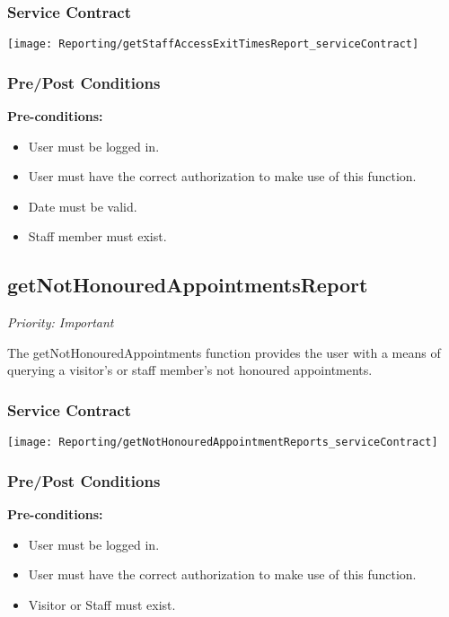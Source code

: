 \subsubsection{Service Contract}
\texttt{[image: Reporting/getStaffAccessExitTimesReport\_serviceContract]}
\subsubsection{Pre/Post Conditions}		
	\textbf{Pre-conditions:}
	\begin{itemize}
		\item User must be logged in.
		\item User must have the correct authorization to make use of this function.
		\item Date must be valid.
		\item Staff member must exist.
	\end{itemize}

\subsection{getNotHonouredAppointmentsReport}
\textit{Priority: Important}

	The getNotHonouredAppointments function provides the user with a means of querying a visitor's or staff member's not honoured appointments.

		
\subsubsection{Service Contract}
\texttt{[image: Reporting/getNotHonouredAppointmentReports\_serviceContract]}
\subsubsection{Pre/Post Conditions}
	\textbf{Pre-conditions:}
	\begin{itemize}
		\item User must be logged in.
		\item User must have the correct authorization to make use of this function.
		\item Visitor or Staff must exist.
	\end{itemize}

